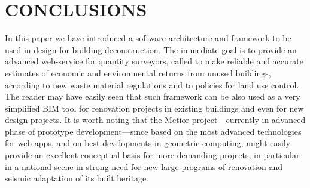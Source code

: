 \section{\uppercase{Conclusions}}
\label{sec:conclusion}

\noindent
In this paper we have introduced a software architecture and framework to be used in  design for building deconstruction. The immediate goal is to provide an advanced web-service for quantity surveyors, called  to make reliable and accurate estimates of economic and environmental returns from unused buildings, according to new waste material regulations and to policies for land use control.
The reader may have easily seen that such framework can be also used as a very simplified BIM tool for renovation projects in existing buildings and even for new design projects. It is worth-noting that the Metior project---currently in advanced phase of prototype development---since based on the most advanced technologies for web apps, and on best developments in geometric computing, might easily provide an excellent conceptual basis for more demanding projects, in particular in a national scene in strong need for new large programs of renovation and seismic adaptation of its built heritage.
